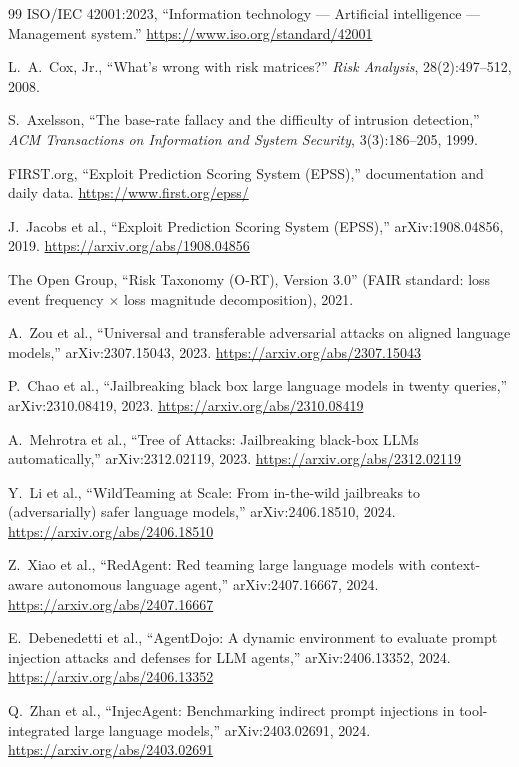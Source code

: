 \begin{thebibliography}{99}
 ISO/IEC 42001:2023, ``Information technology --- Artificial
intelligence --- Management system.'' \url{https://www.iso.org/standard/42001}

 L.~A.~Cox, Jr., ``What's wrong with risk matrices?'' \emph{Risk
Analysis}, 28(2):497--512, 2008.

 S.~Axelsson, ``The base-rate fallacy and the difficulty
of intrusion detection,'' \emph{ACM Transactions on Information and System
Security}, 3(3):186--205, 1999.

 FIRST.org, ``Exploit Prediction Scoring System (EPSS),''
documentation and daily data. \url{https://www.first.org/epss/}

 J.~Jacobs et al., ``Exploit Prediction Scoring System
(EPSS),'' arXiv:1908.04856, 2019. \url{https://arxiv.org/abs/1908.04856}

 The Open Group, ``Risk Taxonomy (O-RT), Version 3.0'' (FAIR
standard: loss event frequency $\times$ loss magnitude decomposition), 2021.

 A.~Zou et al., ``Universal and transferable adversarial attacks
on aligned language models,'' arXiv:2307.15043, 2023.
\url{https://arxiv.org/abs/2307.15043}

 P.~Chao et al., ``Jailbreaking black box large language models
in twenty queries,'' arXiv:2310.08419, 2023. \url{https://arxiv.org/abs/2310.08419}

 A.~Mehrotra et al., ``Tree of Attacks: Jailbreaking black-box
LLMs automatically,'' arXiv:2312.02119, 2023. \url{https://arxiv.org/abs/2312.02119}

 Y.~Li et al., ``WildTeaming at Scale: From in-the-wild
jailbreaks to (adversarially) safer language models,'' arXiv:2406.18510, 2024.
\url{https://arxiv.org/abs/2406.18510}

 Z.~Xiao et al., ``RedAgent: Red teaming large language
models with context-aware autonomous language agent,'' arXiv:2407.16667, 2024.
\url{https://arxiv.org/abs/2407.16667}

 E.~Debenedetti et al., ``AgentDojo: A dynamic environment
to evaluate prompt injection attacks and defenses for LLM agents,''
arXiv:2406.13352, 2024. \url{https://arxiv.org/abs/2406.13352}

 Q.~Zhan et al., ``InjecAgent: Benchmarking indirect prompt
injections in tool-integrated large language models,'' arXiv:2403.02691, 2024.
\url{https://arxiv.org/abs/2403.02691}


\end{thebibliography}
